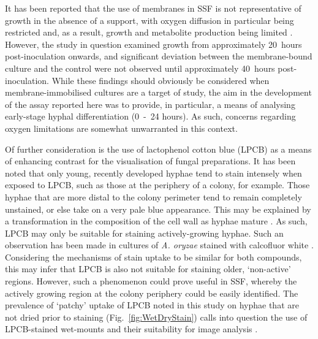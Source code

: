 It has been reported that the use of membranes in SSF is not representative of growth in the absence of a support, with oxygen diffusion in particular being restricted and, as a result, growth and metabolite production being limited \cite{rahardjo2004}. However, the study in question examined growth from approximately 20~hours post-inoculation onwards, and significant deviation between the membrane-bound culture and the control were not observed until approximately 40~hours post-inoculation. While these findings should obviously be considered when membrane-immobilised cultures are a target of study, the aim in the development of the assay reported here was to provide, in particular, a means of analysing early-stage hyphal differentiation (0~-~24 hours). As such, concerns regarding oxygen limitations are somewhat unwarranted in this context.

Of further consideration is the use of lactophenol cotton blue (LPCB) as a means of enhancing contrast for the visualisation of fungal preparations. It has been noted that only young, recently developed hyphae tend to stain intensely when exposed to LPCB, such as those at the periphery of a colony, for example. Those hyphae that are more distal to the colony perimeter tend to remain completely unstained, or else take on a very pale blue appearance. This may be explained by a transformation in the composition of the cell wall as hyphae mature \cite{carlile2001}. As such, LPCB may only be suitable for staining actively-growing hyphae. Such an observation has been made in cultures of \emph{A. oryzae} stained with calcofluor white \cite{amanullah2002}. Considering the mechanisms of stain uptake to be similar for both compounds, this may infer that LPCB is also not suitable for staining older, \lq non-active' regions. However, such a phenomenon could prove useful in SSF, whereby the actively growing region at the colony periphery could be easily identified. The prevalence of \lq patchy' uptake of LPCB noted in this study on hyphae that are not dried prior to staining (Fig.~\ref{fig:WetDryStain}) calls into question the use of LPCB-stained wet-mounts and their suitability for image analysis \cite{amanullah2000,li2000,bizukojc2006,haack2006}.


